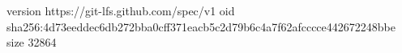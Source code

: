 version https://git-lfs.github.com/spec/v1
oid sha256:4d73eeddec6db272bba0cff371eacb5c2d79b6c4a7f62afcccce442672248bbe
size 32864

